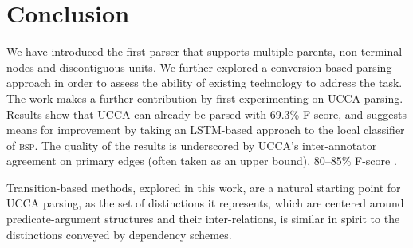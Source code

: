 \documentclass[11pt]{article}
\begin{document}
\section{Conclusion}\label{sec:conclusion}

We have introduced the first parser that supports multiple parents, non-terminal
nodes and discontiguous units.
We further explored a conversion-based parsing approach in order to assess the ability of existing
technology to address the task.
The work makes a further contribution by first experimenting on UCCA parsing.
Results show that UCCA can already be parsed with 69.3\% F-score,
and suggests means for improvement by taking an LSTM-based
approach to the local classifier of \textsc{bsp}.
The quality of the results is underscored by UCCA's inter-annotator
agreement on primary edges (often taken as an upper bound),
80--85\% F-score \cite{abend2013universal}.



Transition-based methods, explored in this work,
are a natural starting point for UCCA parsing,
as the set of distinctions it represents, which are centered around predicate-argument
structures and their inter-relations, is similar in spirit to the distinctions
conveyed by dependency schemes.
\end{document}
